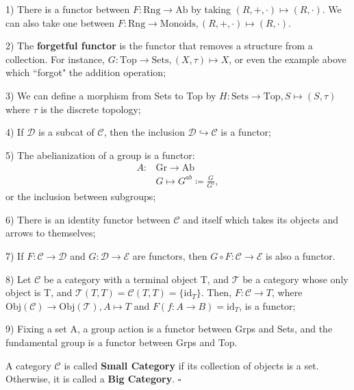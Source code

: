 \documentclass[../category_theory.tex]{subfiles}
\begin{document}
\begin{example}
	\item[1)] There is a functor between \(F:\mathrm{Rng}\rightarrow \mathrm{Ab}\) by taking \((R, +, \cdot )\mapsto (R, \cdot )\). We can also take one between \(F:\mathrm{Rng}\rightarrow \text{Monoids}, (R, +, \cdot)\mapsto (R, \cdot )\).
	\item[2)] The \textbf{forgetful functor} is the functor that removes a structure from a collection. For instance, \(G:\mathrm{Top}\rightarrow \mathrm{Sets}, (X, \tau )\mapsto X\), or even the example above which ``forgot" the addition operation;
	\item[3)] We can define a morphism from Sets to Top by \(H:\mathrm{Sets}\rightarrow \mathrm{Top}, S\mapsto (S, \tau)\) where \(\tau \) is the discrete topology;
	\item[4)] If \(\mathcal{D}\) is a subcat of \(\mathcal{C}\), then the inclusion \(\mathcal{D}\hookrightarrow \mathcal{C} \) is a functor;
	\item[5)] The abelianization of a group is a functor:
	\begin{align*}
		A: & \mathrm{Gr}\rightarrow \mathrm{Ab}     \\
		   & G\mapsto G^{ab}\coloneqq \frac{G}{G'},
	\end{align*}
	or the inclusion between subgroups;
	\item[6)] There is an identity functor between \(\mathcal{C}\) and itself which takes its objects and arrows to themselves;
	\item[7)] If \(F:\mathcal{C}\rightarrow \mathcal{D}\) and \(G:\mathcal{D}\rightarrow \mathcal{E}\) are functors, then \(G\circ F:\mathcal{C}\rightarrow \mathcal{E}\) is also a functor.
	\item[8)] Let \(\mathcal{C}\) be a category with a terminal object T, and \(\mathcal{T}\) be a category whose only object is T, and \(\mathcal{T}(T, T)=\mathcal{C}(T, T)=\{\mathrm{id}_{T}\}\). Then, \(F:\mathcal{C}\rightarrow T\), where \(\mathrm{Obj}(\mathcal{C})\rightarrow \mathrm{Obj}(\mathcal{T}), A\mapsto T\) and \(F(f:A\rightarrow B)=\mathrm{id}_{T}\), is a functor;
	\item[9)] Fixing a set A, a group action is a functor between Grps and Sets, and the fundamental group is a functor between Grps and Top.
\end{example}
\begin{def*}
	A category \(\mathcal{C}\) is called \textbf{Small Category} if its collection of objects is a set. Otherwise, it is called a \textbf{Big Category}. \(\square\)
\end{def*}
\end{document}
